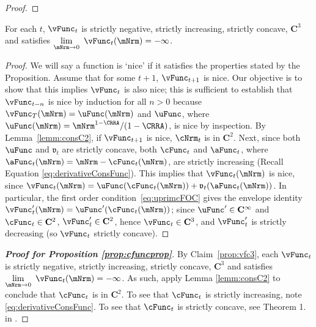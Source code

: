 \documentclass[\econtexRoot/BufferStockTheory]{subfiles}
\begin{document}
\begin{proof}
\end{proof}

\begin{claim}\label{prop:vfc3}
For each $t$, $\vFunc_{t}$ is strictly negative, strictly increasing, strictly concave, $\mathbf{C}^{3}$ and satisfies $\lim\limits_{\mNrm\rightarrow 0}~\vFunc_{t}(\mNrm) =-\infty $.
\end{claim}

\begin{proof}
%
We will say a function is `nice' if it satisfies the properties stated by the Proposition.
Assume that for some $t+1$, $\vFunc_{t+1}$ is nice.
Our objective is to show that this
implies $\vFunc_{t}$ is also nice; this is sufficient to establish that
$\vFunc_{t-n}$ is nice by induction for all $n > 0$ because $\vFunc_{T}(\mNrm)
=\uFunc(\mNrm) $ and $\uFunc$, where $\uFunc(\mNrm)=\mNrm^{1-\CRRA}/(1-\CRRA)$, is nice by inspection.
By Lemma~\ref{lemm:consC2}, if $\vFunc_{t+1}$ is nice, $\cNrm_{t}$ is in $\mathbf{C}^{2}$.
Next, since both $\uFunc$ and $\mathfrak{v}_{t}$ are strictly concave, both
$\cFunc_{t}$ and $\aFunc_{t}$, where $\aFunc_{t}(\mNrm)=\mNrm-\cFunc_{t}(\mNrm)$,
are strictly increasing (Recall Equation \eqref{eq:derivativeConsFunc}).
This implies that
$\vFunc_{t}(\mNrm)$ is nice, since
$\vFunc_{t}(\mNrm)=\uFunc(\cFunc_{t}(\mNrm))+\mathfrak{v}_{t}({\aFunc}_{t}(\mNrm))$.
In particular, the first order condition~\eqref{eq:uprimcFOC} gives the envelope identity $\vFunc_{t}^{\prime}(\mNrm)=\uFunc^{\prime}(\cFunc_{t}(\mNrm))$; since $\uFunc^{\prime}\in\mathbf{C}^{\infty}$ and $\cFunc_{t}\in\mathbf{C}^{2}$, $\vFunc_{t}^{\prime}\in\mathbf{C}^{2}$, hence $\vFunc_{t}\in\mathbf{C}^{3}$, and $\vFunc_{t}^{\prime}$ is strictly decreasing (so $\vFunc_{t}$ strictly concave).
\end{proof}

 
\hypertarget{cFunc-is-Twice-Continuously-Differentiable}{}
\begin{proof}[\textbf{\textit{Proof for Proposition \ref{prop:cfuncprop}}}]

By Claim~\ref{prop:vfc3}, each $\vFunc_{t}$ is strictly negative, strictly increasing, strictly concave, $\mathbf{C}^{3}$ and satisfies $\lim\limits_{\mNrm\rightarrow 0}~\vFunc_{t}(\mNrm) =-\infty $.
As such, apply Lemma \ref{lemm:consC2} to conclude that $\cFunc_{t}$ is in $\mathbf{C}^{2}$.
To see that  $\cFunc_{t}$ is strictly increasing, note \eqref{eq:derivativeConsFunc}.
To see that $\cFunc_{t}$  is strictly concave, see Theorem 1.
in \cite{ckConcavity}.
\end{proof}
\end{document}
